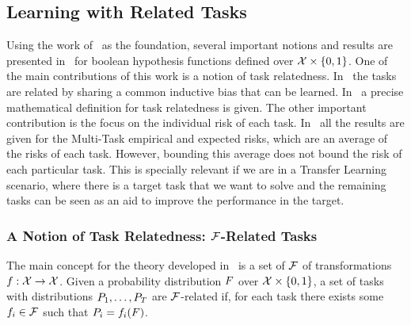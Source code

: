 \subsection{Learning with Related Tasks} %
Using the work of~\cite{baxter2000model} as the foundation, several important notions and results are presented in~\cite{Ben-DavidB08} for boolean hypothesis functions defined over $\mathcal{X} \times \left\{0, 1\right\}$.
One of the main contributions of this work is a notion of task relatedness. In~\cite{baxter2000model} the tasks are related by sharing a common inductive bias that can be learned. In~\cite{Ben-DavidB08} a precise mathematical definition for task relatedness is given.
The other important contribution is the focus on the individual risk of each task. In~\cite{baxter2000model} all the results are given for the Multi-Task empirical and expected risks, which are an average of the risks of each task. However, bounding this average does not bound the risk of each particular task. This is specially relevant if we are in a Transfer Learning scenario, where there is a target task that we want to solve and the remaining tasks can be seen as an aid to improve the performance in the target.

\subsubsection*{A Notion of Task Relatedness: $\mathcal{F}$-Related Tasks}
The main concept for the theory developed in~\cite{Ben-DavidB08} is a set of $\mathcal{F}$ of transformations $f: \mathcal{X} \to \mathcal{X}$. Given a probability distribution $F$ over $\mathcal{X} \times \left\{0, 1\right\}$, a set of tasks with distributions $P_1, \ldots, P_T$ are $\mathcal{F}$-related if, for each task there exists some $f_i \in \mathcal{F}$ such that $P_i = f_i(F)$.

